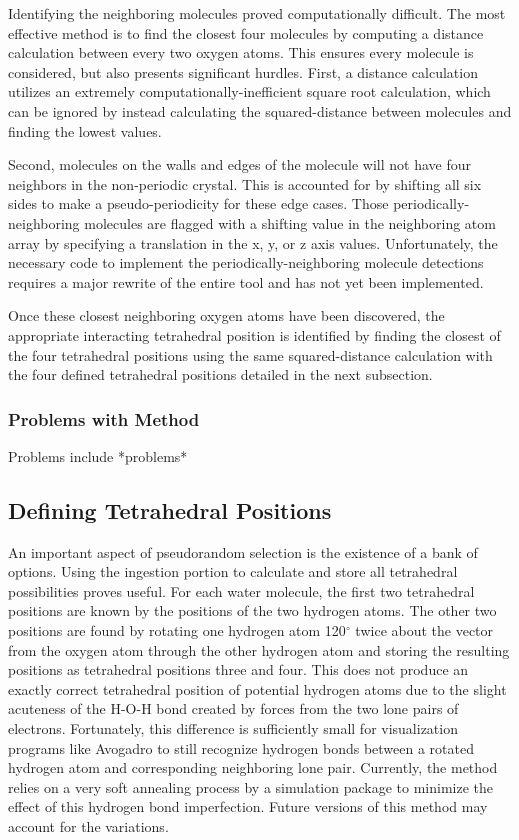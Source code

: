 Identifying the neighboring molecules proved computationally difficult. 
The most effective method is to find the closest four molecules by computing a distance calculation between every two oxygen atoms.
This ensures every molecule is considered, but also presents significant hurdles.
First, a distance calculation utilizes an extremely computationally-inefficient square root calculation, which can be ignored by instead calculating the squared-distance between molecules and finding the lowest values.

Second, molecules on the walls and edges of the molecule will not have four neighbors in the non-periodic crystal. 
This is accounted for by shifting all six sides to make a pseudo-periodicity for these edge cases. 
Those periodically-neighboring molecules are flagged with a shifting value in the neighboring atom array by specifying a translation in the x, y, or z axis values. 
Unfortunately, the necessary code to implement the periodically-neighboring molecule detections requires a major rewrite of the entire tool and has not yet been implemented.

Once these closest neighboring oxygen atoms have been discovered, the appropriate interacting tetrahedral position is identified by finding the closest of the four tetrahedral positions using the same squared-distance calculation with the four defined tetrahedral positions detailed in the next subsection.


\subsubsection{Problems with Method}

Problems include *problems*


\subsection{Defining Tetrahedral Positions}

An important aspect of pseudorandom selection is the existence of a bank of options. %
Using the ingestion portion to calculate and store all tetrahedral possibilities proves useful.
For each water molecule, the first two tetrahedral positions are known by the positions of the two hydrogen atoms. 
The other two positions are found by rotating one hydrogen atom 120$^{\circ}$ twice about the vector from the oxygen atom through the other hydrogen atom and storing the resulting positions as tetrahedral positions three and four. 
This does not produce an exactly correct tetrahedral position of potential hydrogen atoms due to the slight acuteness of the H-O-H bond created by forces from the two lone pairs of electrons. 
Fortunately, this difference is sufficiently small for visualization programs like Avogadro to still recognize hydrogen bonds between a rotated hydrogen atom and corresponding neighboring lone pair. 
Currently, the method relies on a very soft annealing process by a simulation package to minimize the effect of this hydrogen bond imperfection. 
Future versions of this method may account for the variations.

